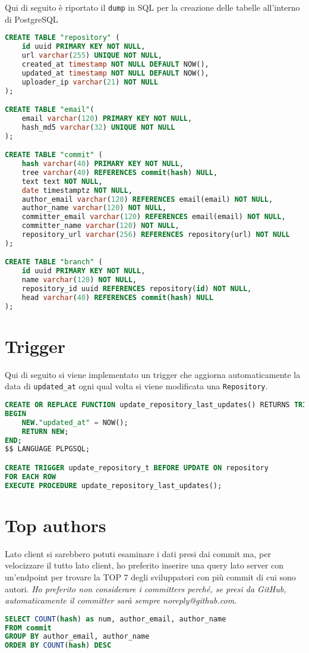 Qui di seguito è riportato il \verb|dump| in SQL per la creazione delle tabelle all'interno di PostgreSQL
\begin{lstlisting}[language=SQL]
CREATE TABLE "repository" (
    id uuid PRIMARY KEY NOT NULL,
    url varchar(255) UNIQUE NOT NULL,
    created_at timestamp NOT NULL DEFAULT NOW(),
    updated_at timestamp NOT NULL DEFAULT NOW(),
    uploader_ip varchar(21) NOT NULL
);

CREATE TABLE "email"(
    email varchar(120) PRIMARY KEY NOT NULL,
    hash_md5 varchar(32) UNIQUE NOT NULL
);

CREATE TABLE "commit" (
    hash varchar(40) PRIMARY KEY NOT NULL,
    tree varchar(40) REFERENCES commit(hash) NULL,
    text text NOT NULL,
    date timestamptz NOT NULL,
    author_email varchar(120) REFERENCES email(email) NOT NULL,
    author_name varchar(120) NOT NULL,
    committer_email varchar(120) REFERENCES email(email) NOT NULL,
    committer_name varchar(120) NOT NULL,
    repository_url varchar(256) REFERENCES repository(url) NOT NULL 
);

CREATE TABLE "branch" (
    id uuid PRIMARY KEY NOT NULL,
    name varchar(120) NOT NULL,
    repository_id uuid REFERENCES repository(id) NOT NULL,
    head varchar(40) REFERENCES commit(hash) NULL
);
\end{lstlisting}

\section{Trigger}
Qui di seguito si viene implementato un trigger che aggiorna automaticamente la data di \verb|updated_at| ogni qual volta si viene modificata una \verb|Repository|.
\begin{lstlisting}[language=SQL]
CREATE OR REPLACE FUNCTION update_repository_last_updates() RETURNS TRIGGER	AS $$
BEGIN
	NEW."updated_at" = NOW();
	RETURN NEW;
END;
$$ LANGUAGE PLPGSQL;

CREATE TRIGGER update_repository_t BEFORE UPDATE ON repository
FOR EACH ROW
EXECUTE PROCEDURE update_repository_last_updates();
\end{lstlisting}

\section{Top authors}
Lato client si sarebbero potuti esaminare i dati presi dai commit ma, per velocizzare il tutto lato client, ho preferito inserire una query lato server con un'endpoint per trovare la TOP 7 degli sviluppatori con più commit di cui sono autori. \textit{Ho preferito non considerare i committers perché, se presi da GitHub, automaticamente il committer sarà sempre noreply@github.com}.

\begin{lstlisting}[language=SQL]
SELECT COUNT(hash) as num, author_email, author_name
FROM commit
GROUP BY author_email, author_name
ORDER BY COUNT(hash) DESC
\end{lstlisting}
